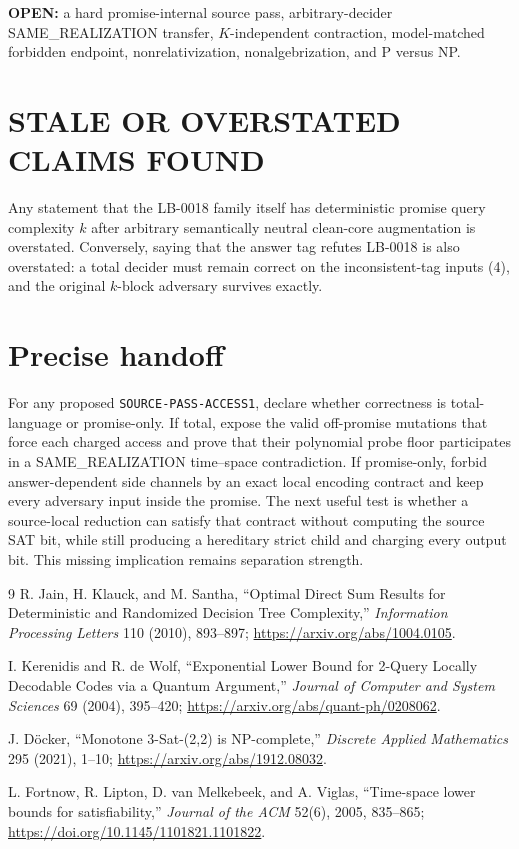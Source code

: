 \documentclass[11pt]{article}
\begin{document}
\textbf{OPEN:} a hard promise-internal source pass, arbitrary-decider
SAME\_REALIZATION transfer, $K$-independent contraction, model-matched
forbidden endpoint, nonrelativization, nonalgebrization, and P versus NP.

\section{STALE OR OVERSTATED CLAIMS FOUND}

Any statement that the LB-0018 family itself has deterministic promise query
complexity $k$ after arbitrary semantically neutral clean-core augmentation is
overstated.  Conversely, saying that the answer tag refutes LB-0018 is also
overstated: a total decider must remain correct on the inconsistent-tag inputs
(4), and the original $k$-block adversary survives exactly.

\section{Precise handoff}

For any proposed \texttt{SOURCE-PASS-ACCESS1}, declare whether correctness is
total-language or promise-only.  If total, expose the valid off-promise
mutations that force each charged access and prove that their polynomial probe
floor participates in a SAME\_REALIZATION time--space contradiction.  If
promise-only, forbid answer-dependent side channels by an exact local encoding
contract and keep every adversary input inside the promise.  The next useful
test is whether a source-local reduction can satisfy that contract without
computing the source SAT bit, while still producing a hereditary strict child
and charging every output bit.  This missing implication remains separation
strength.

\begin{thebibliography}{9}
R. Jain, H. Klauck, and M. Santha,
``Optimal Direct Sum Results for Deterministic and Randomized Decision Tree
Complexity,'' \emph{Information Processing Letters} 110 (2010), 893--897;
\url{https://arxiv.org/abs/1004.0105}.

I. Kerenidis and R. de Wolf,
``Exponential Lower Bound for 2-Query Locally Decodable Codes via a Quantum
Argument,'' \emph{Journal of Computer and System Sciences} 69 (2004), 395--420;
\url{https://arxiv.org/abs/quant-ph/0208062}.

J. D\"ocker, ``Monotone 3-Sat-(2,2) is NP-complete,''
\emph{Discrete Applied Mathematics} 295 (2021), 1--10;
\url{https://arxiv.org/abs/1912.08032}.

L. Fortnow, R. Lipton, D. van Melkebeek, and A. Viglas,
``Time-space lower bounds for satisfiability,'' \emph{Journal of the ACM}
52(6), 2005, 835--865;
\url{https://doi.org/10.1145/1101821.1101822}.
\end{thebibliography}
\end{document}
